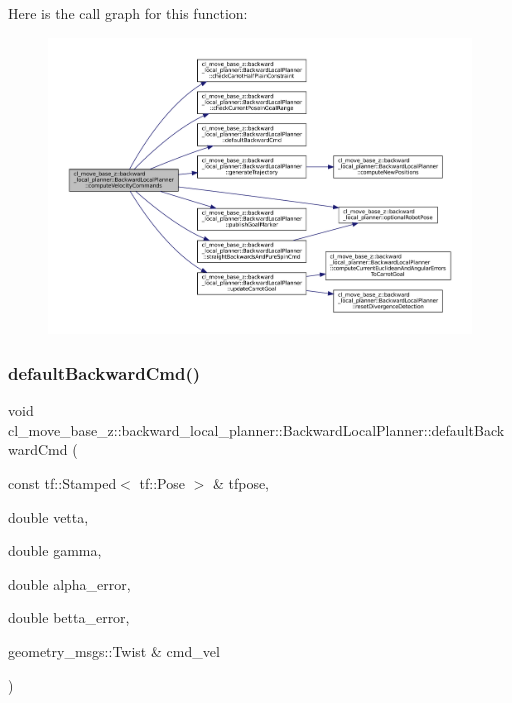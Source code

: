 Here is the call graph for this function\+:
\nopagebreak
\begin{figure}[H]
\begin{center}
\leavevmode
\includegraphics[width=350pt]{classcl__move__base__z_1_1backward__local__planner_1_1BackwardLocalPlanner_a25437208766366ca22f967fe72e80988_cgraph}
\end{center}
\end{figure}
\mbox{\label{classcl__move__base__z_1_1backward__local__planner_1_1BackwardLocalPlanner_a1ebd69a028a22e3573e98f89d593f97d}} 
\subsubsection{\texorpdfstring{default\+Backward\+Cmd()}{defaultBackwardCmd()}}
{\footnotesize\ttfamily void cl\+\_\+move\+\_\+base\+\_\+z\+::backward\+\_\+local\+\_\+planner\+::\+Backward\+Local\+Planner\+::default\+Backward\+Cmd (\begin{DoxyParamCaption}\item[{const tf\+::\+Stamped$<$ tf\+::\+Pose $>$ \&}]{tfpose,  }\item[{double}]{vetta,  }\item[{double}]{gamma,  }\item[{double}]{alpha\+\_\+error,  }\item[{double}]{betta\+\_\+error,  }\item[{geometry\+\_\+msgs\+::\+Twist \&}]{cmd\+\_\+vel }\end{DoxyParamCaption})\hspace{0.3cm}{\ttfamily [private]}}

